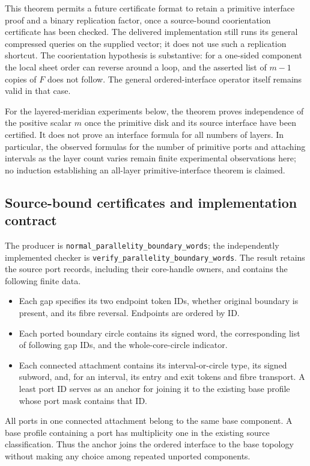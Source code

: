 This theorem permits a future certificate format to retain a primitive
interface proof and a binary replication factor, once a source-bound
coorientation certificate has been checked.  The delivered implementation
still runs its general compressed queries on the supplied vector; it does
not use such a replication shortcut.  The coorientation hypothesis is
substantive: for a one-sided component the local sheet order can reverse
around a loop, and the asserted list of $m-1$ copies of $F$ does not follow.
The general ordered-interface operator itself remains valid in that case.

For the layered-meridian experiments below, the theorem proves independence
of the positive scalar $m$ once the primitive disk and its source interface
have been certified.  It does not prove an interface formula for all
numbers of layers.  In particular, the observed formulas for the number
of primitive ports and attaching intervals as the layer count varies
remain finite experimental observations here; no induction establishing
an all-layer primitive-interface theorem is claimed.


\subsection{Source-bound certificates and implementation contract}
\label{int:certificates}

The producer is
\texttt{normal\_parallelity\_boundary\_words}; the independently implemented
checker is \texttt{verify\_parallelity\_boundary\_words}.  The result retains
the source port records, including their core-handle owners, and contains
the following finite data.
\begin{itemize}
\item Each gap specifies its two endpoint token IDs, whether original
boundary is present, and its fibre reversal.  Endpoints are ordered by ID.
\item Each ported boundary circle contains its signed word, the corresponding
list of following gap IDs, and the whole-core-circle indicator.
\item Each connected attachment contains its interval-or-circle type, its
signed subword, and, for an interval, its entry and exit tokens and fibre
transport.  A least port ID serves as an anchor for joining it to the
existing base profile whose port mask contains that ID.
\end{itemize}

All ports in one connected attachment belong to the same base component.
A base profile containing a port has multiplicity one in the existing
source classification.  Thus the anchor joins the ordered interface to
the base topology without making any choice among repeated unported
components.

